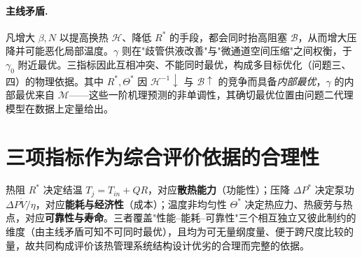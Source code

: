 \documentclass[UTF8,a4paper,12pt]{ctexart}
\numberwithin{equation}{section}
\begin{document}
\paragraph{主线矛盾.}凡增大 $\beta,N$ 以提高换热 $\mathcal H$、降低 $R^*$ 的手段，都会同时抬高阻塞 $\mathcal B$，从而增大压降并可能恶化局部温度。$\gamma$ 则在"歧管供液改善"与"微通道空间压缩"之间权衡，于 $\gamma_0$ 附近最优。三指标因此互相冲突、不能同时最优，构成多目标优化（问题三、四）的物理依据。其中 $R^*,\Theta^*$ 因 $\mathcal H^{-1}\!\downarrow$ 与 $\mathcal B\!\uparrow$ 的竞争而具备\emph{内部最优}，$\gamma$ 的内部最优来自 $\mathcal M$——这些一阶机理预测的非单调性，其确切最优位置由问题二代理模型在数据上定量给出。

\section{三项指标作为综合评价依据的合理性}

热阻 $R^*$ 决定结温 $T_j=T_{in}+QR$，对应\textbf{散热能力}（功能性）；压降 $\Delta P^*$ 决定泵功 $\Delta P\dot V/\eta$，对应\textbf{能耗与经济性}（成本）；温度非均匀性 $\Theta^*$ 决定热应力、热疲劳与热点，对应\textbf{可靠性与寿命}。三者覆盖"性能--能耗--可靠性"三个相互独立又彼此制约的维度（由主线矛盾可知不可同时最优），且均为可无量纲度量、便于跨尺度比较的量，故共同构成评价该热管理系统结构设计优劣的合理而完整的依据。
\end{document}
